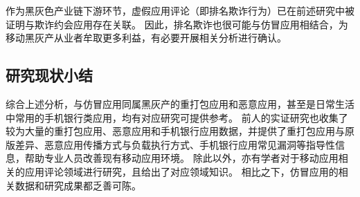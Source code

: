作为黑灰色产业链下游环节，虚假应用评论（即排名欺诈行为）已在前述研究中被证明与欺诈约会应用存在关联。
因此，排名欺诈也很可能与仿冒应用相结合，为移动黑灰产从业者牟取更多利益，有必要开展相关分析进行确认。

\subsection{研究现状小结}
综合上述分析，与仿冒应用同属黑灰产的重打包应用和恶意应用，甚至是日常生活中常用的手机银行类应用，均有对应研究可提供参考。
前人的实证研究也收集了较为大量的重打包应用、恶意应用和手机银行应用数据，并提供了重打包应用与原版差异、恶意应用传播方式与负载执行方式、手机银行应用常见漏洞等指导性信息，帮助专业人员改善现有移动应用环境。
除此以外，亦有学者对于移动应用相关的应用评论领域进行研究，且给出了对应领域知识。
相比之下，仿冒应用的相关数据和研究成果都乏善可陈。

